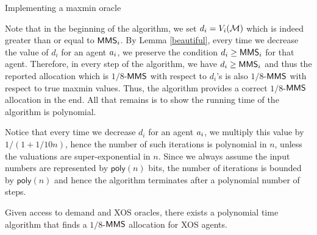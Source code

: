 \begin{algorithm}%
	\caption{Implementing a maxmin oracle}
	\label{oracle}
\end{algorithm}

Note that in the beginning of the algorithm, we set $d_i = V_i(\mathcal{M})$ which is indeed greater than or equal to $\mathsf{MMS}_i$. By Lemma \ref{beautiful}, every time we decrease the value of $d_i$ for an agent $a_i$, we preserve the condition $d_i \geq \mathsf{MMS}_i$ for that agent. Therefore, in every step of the algorithm, we have $d_i \geq \mathsf{MMS}_i$ and thus the reported allocation which is $1/8$-$\mathsf{MMS}$ with respect to $d_i$'s is also $1/8$-$\mathsf{MMS}$ with respect to true maxmin values. Thus, the algorithm provides a correct $1/8$-$\mathsf{MMS}$ allocation in the end. All that remains is to show the running time of the algorithm is polynomial.

Notice that every time we decrease $d_i$ for an agent $a_i$, we multiply this value by $1/(1+1/10n)$, hence the number of such iterations is polynomial in $n$, unless the valuations are super-exponential in $n$. Since we always assume the input numbers are represented by $\mathsf{poly}(n)$ bits, the number of iterations is bounded by $\mathsf{poly}(n)$ and hence the algorithm terminates after a polynomial number of steps.

\begin{theorem}\label{xa}
	Given access to demand and XOS oracles, there exists a polynomial time algorithm that finds a $1/8$-$\mathsf{MMS}$ allocation for XOS agents.
\end{theorem}

